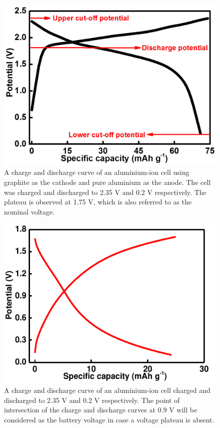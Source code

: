 \begin{itemize}
\begin{figure}[h!]
\centering
\includegraphics[width=\textwidth]{Figures/chap1fig/CDCforcellvoltage}
\caption{A charge and discharge curve of an aluminium-ion cell using graphite as the cathode and pure aluminium as the anode. The cell was charged and discharged to 2.35 V and 0.2 V respectively. The plateau is observed at 1.75 V, which is also referred to as the nominal voltage.}
\label{Figures/chap1fig:CDCforcellvoltage}
\end{figure}

\begin{figure}[tbh!]
\centering
\includegraphics[width=\textwidth]{Figures/chap1fig/batpot.pdf}
\caption{A charge and discharge curve of an aluminium-ion cell charged and discharged to 2.35 V and 0.2 V respectively. The point of intersection of the charge and discharge curves at 0.9 V will be considered as the battery voltage in case a voltage plateau is absent.}
\label{Figures/chap1fig:batpot}
\end{figure}


\end{itemize}
